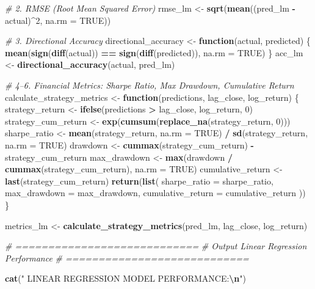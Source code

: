 \documentclass[
]{article}
\newenvironment{Shaded}{\begin{snugshade}}{\end{snugshade}}
\newcommand{\AttributeTok}[1]{\textcolor[rgb]{0.13,0.29,0.53}{#1}}
\newcommand{\CommentTok}[1]{\textcolor[rgb]{0.56,0.35,0.01}{\textit{#1}}}
\newcommand{\ConstantTok}[1]{\textcolor[rgb]{0.56,0.35,0.01}{#1}}
\newcommand{\ControlFlowTok}[1]{\textcolor[rgb]{0.13,0.29,0.53}{\textbf{#1}}}
\newcommand{\DecValTok}[1]{\textcolor[rgb]{0.00,0.00,0.81}{#1}}
\newcommand{\FunctionTok}[1]{\textcolor[rgb]{0.13,0.29,0.53}{\textbf{#1}}}
\newcommand{\NormalTok}[1]{#1}
\newcommand{\OtherTok}[1]{\textcolor[rgb]{0.56,0.35,0.01}{#1}}
\newcommand{\SpecialCharTok}[1]{\textcolor[rgb]{0.81,0.36,0.00}{\textbf{#1}}}
\newcommand{\StringTok}[1]{\textcolor[rgb]{0.31,0.60,0.02}{#1}}
\begin{document}
\begin{Shaded}
\begin{Highlighting}[]
\CommentTok{\# 2. RMSE (Root Mean Squared Error)}
\NormalTok{rmse\_lm }\OtherTok{\textless{}{-}} \FunctionTok{sqrt}\NormalTok{(}\FunctionTok{mean}\NormalTok{((pred\_lm }\SpecialCharTok{{-}}\NormalTok{ actual)}\SpecialCharTok{\^{}}\DecValTok{2}\NormalTok{, }\AttributeTok{na.rm =} \ConstantTok{TRUE}\NormalTok{))}

\CommentTok{\# 3. Directional Accuracy}
\NormalTok{directional\_accuracy }\OtherTok{\textless{}{-}} \ControlFlowTok{function}\NormalTok{(actual, predicted) \{}
  \FunctionTok{mean}\NormalTok{(}\FunctionTok{sign}\NormalTok{(}\FunctionTok{diff}\NormalTok{(actual)) }\SpecialCharTok{==} \FunctionTok{sign}\NormalTok{(}\FunctionTok{diff}\NormalTok{(predicted)), }\AttributeTok{na.rm =} \ConstantTok{TRUE}\NormalTok{)}
\NormalTok{\}}
\NormalTok{acc\_lm }\OtherTok{\textless{}{-}} \FunctionTok{directional\_accuracy}\NormalTok{(actual, pred\_lm)}

\CommentTok{\# 4–6. Financial Metrics: Sharpe Ratio, Max Drawdown, Cumulative Return}
\NormalTok{calculate\_strategy\_metrics }\OtherTok{\textless{}{-}} \ControlFlowTok{function}\NormalTok{(predictions, lag\_close, log\_return) \{}
\NormalTok{  strategy\_return }\OtherTok{\textless{}{-}} \FunctionTok{ifelse}\NormalTok{(predictions }\SpecialCharTok{\textgreater{}}\NormalTok{ lag\_close, log\_return, }\DecValTok{0}\NormalTok{)}
\NormalTok{  strategy\_cum\_return }\OtherTok{\textless{}{-}} \FunctionTok{exp}\NormalTok{(}\FunctionTok{cumsum}\NormalTok{(}\FunctionTok{replace\_na}\NormalTok{(strategy\_return, }\DecValTok{0}\NormalTok{)))}
\NormalTok{  sharpe\_ratio }\OtherTok{\textless{}{-}} \FunctionTok{mean}\NormalTok{(strategy\_return, }\AttributeTok{na.rm =} \ConstantTok{TRUE}\NormalTok{) }\SpecialCharTok{/} \FunctionTok{sd}\NormalTok{(strategy\_return, }\AttributeTok{na.rm =} \ConstantTok{TRUE}\NormalTok{)}
\NormalTok{  drawdown }\OtherTok{\textless{}{-}} \FunctionTok{cummax}\NormalTok{(strategy\_cum\_return) }\SpecialCharTok{{-}}\NormalTok{ strategy\_cum\_return}
\NormalTok{  max\_drawdown }\OtherTok{\textless{}{-}} \FunctionTok{max}\NormalTok{(drawdown }\SpecialCharTok{/} \FunctionTok{cummax}\NormalTok{(strategy\_cum\_return), }\AttributeTok{na.rm =} \ConstantTok{TRUE}\NormalTok{)}
\NormalTok{  cumulative\_return }\OtherTok{\textless{}{-}} \FunctionTok{last}\NormalTok{(strategy\_cum\_return)}
  \FunctionTok{return}\NormalTok{(}\FunctionTok{list}\NormalTok{(}
    \AttributeTok{sharpe\_ratio =}\NormalTok{ sharpe\_ratio,}
    \AttributeTok{max\_drawdown =}\NormalTok{ max\_drawdown,}
    \AttributeTok{cumulative\_return =}\NormalTok{ cumulative\_return}
\NormalTok{  ))}
\NormalTok{\}}

\NormalTok{metrics\_lm }\OtherTok{\textless{}{-}} \FunctionTok{calculate\_strategy\_metrics}\NormalTok{(pred\_lm, lag\_close, log\_return)}

\CommentTok{\# ============================}
\CommentTok{\#  Output Linear Regression Performance}
\CommentTok{\# ============================}

\FunctionTok{cat}\NormalTok{(}\StringTok{" LINEAR REGRESSION MODEL PERFORMANCE:}\SpecialCharTok{\textbackslash{}n}\StringTok{"}\NormalTok{)}
\end{Highlighting}
\end{Shaded}
\end{document}

